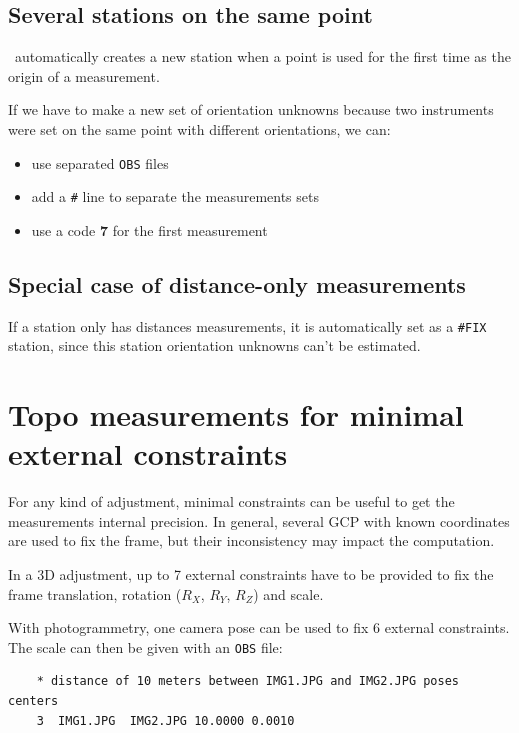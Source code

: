 \subsection{Several stations on the same point}

\CdPPP\ automatically creates a new station when a point is used for the first time as the origin of a measurement.

If we have to make a new set of orientation unknowns because two instruments were set on the same point with different
orientations, we can:

\begin{itemize}
   \item use separated \texttt{OBS} files
   \item add a \texttt{\#} line to separate the measurements sets
   \item use a code \textbf{7} for the first measurement
\end{itemize}


\subsection{Special case of distance-only measurements}

If a station only has distances measurements, it is automatically
set as a \texttt{\#FIX} station, since this station orientation unknowns
can't be estimated.


\section{Topo measurements for minimal external constraints}

For any kind of adjustment, minimal constraints can be useful to get the measurements internal precision.
In general, several GCP with known coordinates are used to fix the frame, but their inconsistency may
impact the computation.

In a 3D adjustment, up to 7 external constraints have to be provided to fix the frame translation, rotation ($R_X$, $R_Y$, $R_Z$) and scale.

With photogrammetry, one camera pose can be used to fix 6 external constraints. The scale can then be given with an \texttt{OBS} file:
\begin{verbatim}
    * distance of 10 meters between IMG1.JPG and IMG2.JPG poses centers
    3  IMG1.JPG  IMG2.JPG 10.0000 0.0010   
\end{verbatim}

